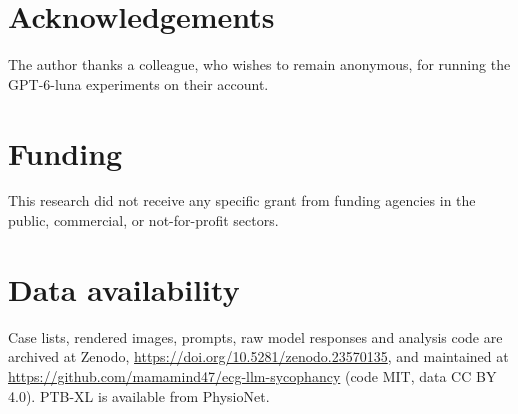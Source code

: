 \documentclass[preprint,12pt]{elsarticle}
\begin{document}
\section*{Acknowledgements}
The author thanks a colleague, who wishes to remain anonymous, for running the GPT-6-luna experiments on their account.

\section*{Funding}
This research did not receive any specific grant from funding agencies in the public, commercial, or not-for-profit sectors.

\section*{Data availability}
Case lists, rendered images, prompts, raw model responses and analysis code are archived at Zenodo, \url{https://doi.org/10.5281/zenodo.23570135}, and maintained at \url{https://github.com/mamamind47/ecg-llm-sycophancy} (code MIT, data CC BY 4.0). PTB-XL is available from PhysioNet.



\end{document}
